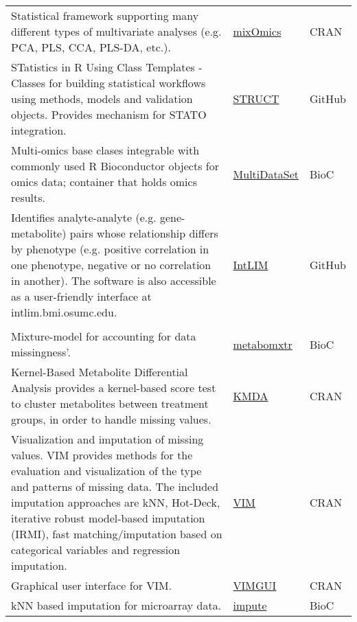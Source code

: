 \documentclass[]{article}
\begin{document}
\begin{longtable}[t]{>{\raggedright\arraybackslash}p{30em}>{\raggedright\arraybackslash}p{10em}>{\raggedright\arraybackslash}p{3em}}
\rowcolor{gray!6}  Statistical framework supporting many different types of multivariate analyses (e.g. PCA, PLS, CCA, PLS-DA, etc.). & \href{https://cran.r-project.org/web/packages/mixOmics/index.html}{mixOmics} & CRAN\\
STatistics in R Using Class Templates - Classes for building statistical workflows using methods, models and validation objects. Provides mechanism for STATO integration. & \href{http://www.github.com/computational-metabolomics/struct}{STRUCT} & GitHub\\
\rowcolor{gray!6}  Multi-omics base clases integrable with commonly used R Bioconductor objects for omics data; container that holds omics results. & \href{https://bioconductor.org/packages/release/bioc/html/MultiDataSet.html}{MultiDataSet} & BioC\\
Identifies analyte-analyte (e.g. gene-metabolite) pairs whose relationship differs by phenotype (e.g. positive correlation in one phenotype, negative or no correlation in another). The software is also accessible as a user-friendly interface at intlim.bmi.osumc.edu. & \href{https://github.com/mathelab/IntLIM}{IntLIM} & GitHub\\
\rowcolor{gray!6}  \addlinespace[0.3em]
\multicolumn{3}{l}{\textbf{Missing value imputation}}\\
Mixture-model for accounting for data missingness'. & \href{https://doi.org/doi:10.18129/B9.bioc.metabomxtr}{metabomxtr} & BioC\\
Kernel-Based Metabolite Differential Analysis provides a kernel-based score test to cluster metabolites between treatment groups, in order to handle missing values. & \href{https://cran.r-project.org/web/packages/KMDA/}{KMDA} & CRAN\\
\rowcolor{gray!6}  Visualization and imputation of missing values. VIM provides methods for the evaluation and visualization of the type and patterns of missing data. The included imputation approaches are kNN, Hot-Deck, iterative robust model-based imputation (IRMI), fast matching/imputation based on categorical variables and regression imputation. & \href{https://cran.r-project.org/web/packages/VIM/index.html}{VIM} & CRAN\\
Graphical user interface for VIM. & \href{https://cran.r-project.org/web/packages/VIMGUI/VIMGUI.pdf}{VIMGUI} & CRAN\\
\rowcolor{gray!6}  kNN based imputation for microarray data. & \href{https://www.bioconductor.org/packages//2.10/bioc/html/impute.html}{impute} & BioC\\

\end{longtable}
\end{document}
